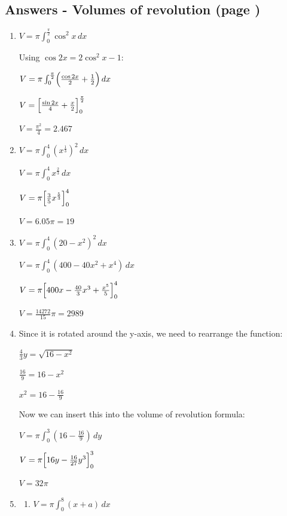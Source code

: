 \documentclass[../main.tex]{subfiles}
\begin{document}
\subsection*{Answers - Volumes of revolution (page \pageref{Volumes of revolution})}

\begin{spacing}{1.5}

\begin{enumerate}[itemsep=0.7cm]
    \item 
    $V=\pi \int_0^{\frac{\pi}{2}} \cos^2{x}\,dx$

    Using $\cos{2x}=2\cos^2{x}-1$:

    $V=\pi \int_0^{\frac{\pi}{2}} \Bigl(\frac{\cos{2x}}{2}+\frac{1}{2}\Bigr)\, dx$

    $V=\Bigl[\frac{\sin{2x}}{4}+\frac{x}{2}\Bigr]_0^{\frac{\pi}{2}}$

    $V=\frac{\pi^2}{4}=2.467$

    \item 
    $V=\pi \int_0^4 (x^{\frac{1}{3}})^2\,dx$

    $V=\pi \int_0^4 x^{\frac{2}{3}}\, dx$

    $V=\pi \Bigl[\frac{3}{5}x^{\frac{5}{3}} \Bigr]_0^4$

    $V=6.05\pi = 19$

    \item
    $V=\pi \int_0^4 (20-x^2)^2\, dx$

    $V=\pi \int_0^4 (400-40x^2+x^4)\,dx$

    $V=\pi \Bigl[400x-\frac{40}{3}x^3+\frac{x^5}{5} \Bigr]_0^4$

    $V=\frac{14272}{15}\pi=2989$

    \item 
    Since it is rotated around the y-axis, we need to rearrange the function:

    $\frac{4}{3}y=\sqrt{16-x^2}$

    $\frac{16}{9}=16-x^2$

    $x^2=16-\frac{16}{9}$

    Now we can insert this into the volume of revolution formula:

    $V=\pi \int_0^3 (16-\frac{16}{9})\,dy$

    $V=\pi \Bigl[16y-\frac{16}{27}y^3\Bigr]_0^3$

    $V=32\pi$

    \item 
    
    \begin{enumerate}
        \item 
        $V=\pi \int_0^8 (x+a)\,dx$


\end{enumerate}
\end{enumerate}
\end{spacing}
\end{document}
